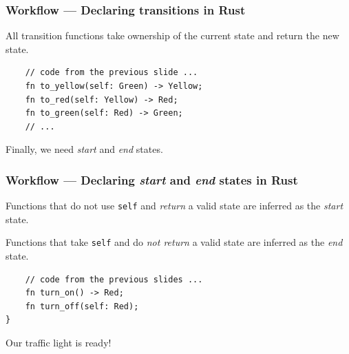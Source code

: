 \documentclass[bigger,notes]{beamer}
\begin{document}
\begin{frame}[fragile]
    \frametitle{Workflow --- Declaring transitions in Rust}
    All transition functions take ownership of the current state and return the new state.
    \begin{listing}
        \centering
        \begin{verbatim}
    // code from the previous slide ...
    fn to_yellow(self: Green) -> Yellow;
    fn to_red(self: Yellow) -> Red;
    fn to_green(self: Red) -> Green;
    // ...
        \end{verbatim}
    \end{listing}
    Finally, we need \emph{start} and \emph{end} states.

\end{frame}

\begin{frame}[fragile]
    \frametitle{Workflow --- Declaring \emph{start} and \emph{end} states in Rust}
    Functions that do not use \texttt{self} and \emph{return} a valid state are inferred as the \emph{start} state.

    Functions that take \texttt{self} and do \emph{not return }a valid state are inferred as the \emph{end} state.
    \begin{listing}
        \centering
        \begin{verbatim}
    // code from the previous slides ...
    fn turn_on() -> Red;
    fn turn_off(self: Red);
}
        \end{verbatim}
    \end{listing}
    Our traffic light is ready!

\end{frame}
\end{document}
